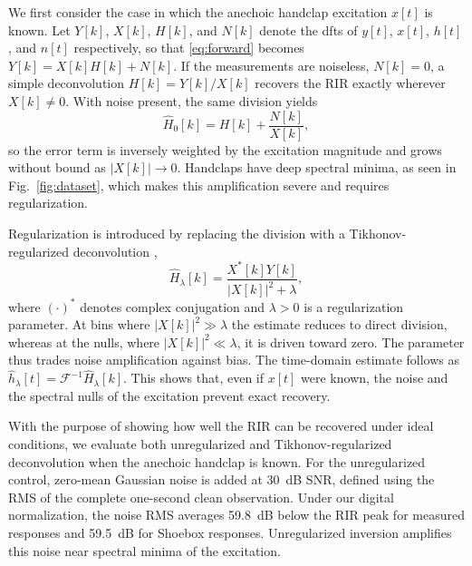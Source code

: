 \documentclass{article}
\begin{document}
We first consider the case in which the anechoic handclap excitation $x[t]$ is known. 
Let $Y[k]$, $X[k]$, $H[k]$, and $N[k]$ denote the \acp{dft} of $y[t]$, $x[t]$, $h[t]$, and $n[t]$ respectively, so that \eqref{eq:forward} becomes $Y[k]=X[k]H[k] + N[k]$.
If the measurements are noiseless, $N[k]=0$, a simple deconvolution $H[k] = Y[k]/X[k]$ recovers the RIR exactly wherever $X[k]\neq 0$.
With noise present, the same division yields
\begin{equation}
    \widehat H_{0}[k] =
    H[k]+\frac{N[k]}{X[k]},
    \label{eq:direct_noise}
\end{equation}
so the error term is inversely weighted by the excitation magnitude and grows without bound as $|X[k]|\to0$. Handclaps have deep spectral minima, as seen in Fig.~\ref{fig:dataset}, which makes this amplification severe and requires regularization.

Regularization is introduced by replacing the division with a
Tikhonov-regularized deconvolution \cite{kirkeby1999digital},
\begin{equation}
\widehat H_{\lambda}[k]
=
\frac{X^*[k]Y[k]}
{|X[k]|^{2}+\lambda},
\label{eq:tikhonov}
\end{equation}
where $(\cdot)^*$ denotes complex conjugation and $\lambda>0$ is a regularization parameter. 
At bins where $|X[k]|^{2}\gg\lambda$ the estimate reduces to direct division, whereas at the nulls, where $|X[k]|^{2}\ll\lambda$, it is driven toward zero. The parameter thus trades noise amplification against bias. The time-domain estimate follows as $\widehat h_{\lambda}[t]=\mathcal{F}^{-1}{\widehat H_{\lambda}[k]}$.
This shows that, even if $x[t]$ were known, the noise and the spectral nulls of the excitation prevent exact recovery.


With the purpose of showing how well the RIR can be recovered under ideal conditions, we evaluate both unregularized and Tikhonov-regularized deconvolution when the
anechoic handclap is known. For the unregularized control, zero-mean Gaussian noise is added at 30~dB SNR, defined using the RMS of the complete one-second clean observation. Under our digital normalization, the noise RMS averages 59.8~dB below the RIR peak for measured responses and 59.5~dB for Shoebox responses. Unregularized inversion amplifies this noise near spectral minima of the excitation. %
\end{document}
